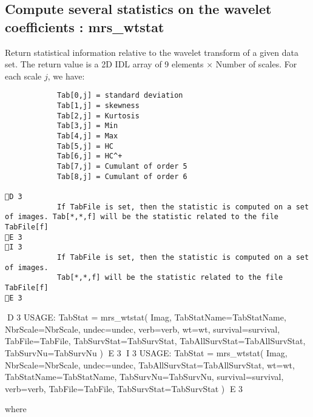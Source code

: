 \subsection{Compute several statistics on the wavelet coefficients : mrs\_wtstat}
Return statistical information relative to the wavelet transform of a given data set.
The return value is a 2D IDL array of 9 elements $\times$ Number of scales. For each scale $j$, we have:
\begin{verbatim}
			Tab[0,j] = standard deviation
			Tab[1,j] = skewness
			Tab[2,j] = Kurtosis
			Tab[3,j] = Min
			Tab[4,j] = Max 
			Tab[5,j] = HC
			Tab[6,j] = HC^+
			Tab[7,j] = Cumulant of order 5
			Tab[8,j] = Cumulant of order 6
			
D 3
			If TabFile is set, then the statistic is computed on a set of images. Tab[*,*,f] will be the statistic related to the file TabFile[f]
E 3
I 3
			If TabFile is set, then the statistic is computed on a set of images.
			Tab[*,*,f] will be the statistic related to the file TabFile[f]
E 3
\end{verbatim}
{\bf
\begin{center}
D 3
     USAGE: TabStat = mrs\_wtstat( Imag, TabStatName=TabStatName, NbrScale=NbrScale, undec=undec, verb=verb, wt=wt, 
     survival=survival, TabFile=TabFile, TabSurvStat=TabSurvStat, TabAllSurvStat=TabAllSurvStat, TabSurvNu=TabSurvNu )
E 3
I 3
     USAGE: TabStat = mrs\_wtstat( Imag, NbrScale=NbrScale, undec=undec, TabAllSurvStat=TabAllSurvStat, wt=wt, 
     TabStatName=TabStatName, TabSurvNu=TabSurvNu, survival=survival, verb=verb, TabFile=TabFile, TabSurvStat=TabSurvStat )
E 3
\end{center}}
where 
